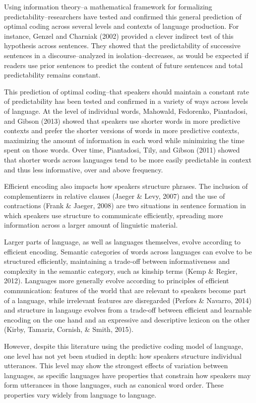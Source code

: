 \documentclass[man,floatsintext]{apa6}
\begin{document}
Using information theory--a mathematical framework for formalizing predictability--researchers have tested and confirmed this general prediction of optimal coding across several levels and contexts of language production. For instance, Genzel and Charniak (2002) provided a clever indirect test of this hypothesis across sentences. They showed that the predictability of successive sentences in a discourse--analyzed in isolation--decreases, as would be expected if readers use prior sentences to predict the content of future sentences and total predictability remains constant.

This prediction of optimal coding--that speakers should maintain a constant rate of predictability has been tested and confirmed in a variety of ways across levels of language. At the level of individual words, Mahowald, Fedorenko, Piantadosi, and Gibson (2013) showed that speakers use shorter words in more predictive contexts and prefer the shorter versions of words in more predictive contexts, maximizing the amount of information in each word while minimizing the time spent on those words. Over time, Piantadosi, Tily, and Gibson (2011) showed that shorter words across languages tend to be more easily predictable in context and thus less informative, over and above frequency.

Efficient encoding also impacts how speakers structure phrases. The inclusion of complementizers in relative clauses (Jaeger \& Levy, 2007) and the use of contractions (Frank \& Jaeger, 2008) are two situations in sentence formation in which speakers use structure to communicate efficiently, spreading more information across a larger amount of linguistic material.

Larger parts of language, as well as languages themselves, evolve according to efficient encoding. Semantic categories of words across languages can evolve to be structured efficiently, maintaining a trade-off between informativeness and complexity in the semantic category, such as kinship terms (Kemp \& Regier, 2012). Languages more generally evolve according to principles of efficient communication: features of the world that are relevant to speakers become part of a language, while irrelevant features are disregarded (Perfors \& Navarro, 2014) and structure in langauge evolves from a trade-off between efficient and learnable encoding on the one hand and an expressive and descriptive lexicon on the other (Kirby, Tamariz, Cornish, \& Smith, 2015).

However, despite this literature using the predictive coding model of language, one level has not yet been studied in depth: how speakers structure individual utterances. This level may show the strongest effects of variation between languages, as specific languages have properties that constrain how speakers may form utterances in those languages, such as canonical word order. These properties vary widely from language to language.
\end{document}

